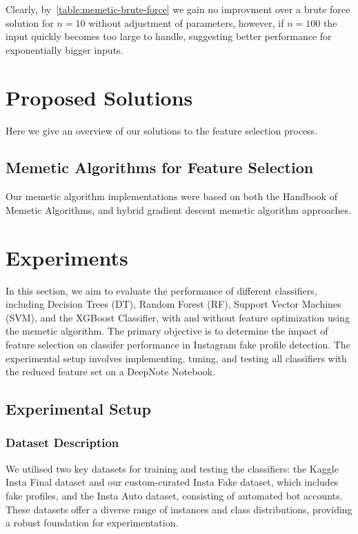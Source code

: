 \documentclass[conference]{IEEEtran}
\begin{document}
Clearly, by~\autoref{table:memetic-brute-force} we gain no improvment over a brute force solution for $n=10$ without adjustment of parameters, however, if $n=100$ the input quickly becomes too large to handle, suggesting better performance for exponentially bigger inputs.

\section{Proposed Solutions}\label{sec:solutions}

Here we give an overview of our solutions to the feature selection process.

\subsection{Memetic Algorithms for Feature Selection}

Our memetic algorithm implementations were based on both the Handbook of Memetic Algorithms\cite{CottaEtAl2018}, and hybrid gradient descent memetic algorithm approaches\cite{ArabAlfi2015}.


\section{Experiments}

In this section, we aim to evaluate the performance of different classifiers, including Decision Trees (DT), Random Forest (RF), Support Vector Machines (SVM), and the XGBoost Classifier, with and without feature optimization using the memetic algorithm. The primary objective is to determine the impact of feature selection on classifer performance in Instagram fake profile detection. The experimental setup involves implementing, tuning, and testing all classifiers with the reduced feature set on a DeepNote Notebook.

\subsection{Experimental Setup}

\subsubsection{Dataset Description}

We utilised two key datasets for training and testing the classifiers: the Kaggle Insta Final dataset and our custom-curated Insta Fake dataset, which includes fake profiles, and the Insta Auto dataset, consisting of automated bot accounts. These datasets offer a diverse range of instances and class distributions, providing a robust foundation for experimentation.
\end{document}
